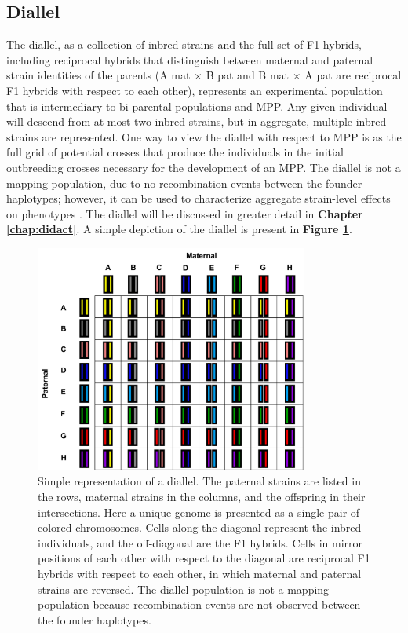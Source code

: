 \subsection{Diallel}

The diallel, as a collection of inbred strains and the full set of F1 hybrids, including reciprocal hybrids that distinguish between maternal and paternal strain identities of the parents (A mat $\times$ B pat and B mat $\times$ A pat are reciprocal F1 hybrids with respect to each other), represents an experimental population that is intermediary to bi-parental populations and MPP. Any given individual will descend from at most two inbred strains, but in aggregate, multiple inbred strains are represented. One way to view the diallel with respect to MPP is as the full grid of potential crosses that produce the individuals in the initial outbreeding crosses necessary for the development of an MPP. The diallel is not a mapping population, due to no recombination events between the founder haplotypes; however, it can be used to characterize aggregate strain-level effects on phenotypes \citep{Lenarcic2012}. The diallel will be discussed in greater detail in \textbf{Chapter \ref{chap:didact}}. A simple depiction of the diallel is present in \textbf{Figure \ref{fig:intro_cartoon_diallel}}.

\begin{figure}
\centering
\includegraphics[width=0.8\textwidth, trim={0in 0in 0in 0in}, clip]{figures/1-introduction/diallel_example.pdf}
\caption[Simplified representation of diallel]{Simple representation of a diallel. The paternal strains are listed in the rows, maternal strains in the columns, and the offspring in their intersections. Here a unique genome is presented as a single pair of colored chromosomes. Cells along the diagonal represent the inbred individuals, and the off-diagonal are the F1 hybrids. Cells in mirror positions of each other with respect to the diagonal are reciprocal  F1 hybrids with respect to each other, in which maternal and paternal strains are reversed. The diallel population is not a mapping population because recombination events are not observed between the founder haplotypes. \label{fig:intro_cartoon_diallel}}
\end{figure}

